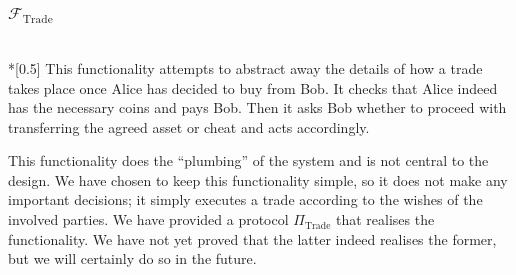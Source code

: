 \subsubsection{$\mathcal{F}_{\mathrm{Trade}}$} \ \\*[0.5\baselineskip]
  This functionality attempts to abstract away the details of how a trade takes place once
  Alice has decided to buy from Bob. It checks that Alice indeed has the necessary coins
  and pays Bob. Then it asks Bob whether to proceed with transferring the agreed asset or
  cheat and acts accordingly.

  This functionality does the ``plumbing'' of the system and is not central to the design.
  We have chosen to keep this functionality simple, so it does not make any important
  decisions; it simply executes a trade according to the wishes of the involved parties.
  We have provided a protocol $\Pi_{\mathrm{Trade}}$ that realises the functionality. We
  have not yet proved that the latter indeed realises the former, but we will certainly do
  so in the future.
